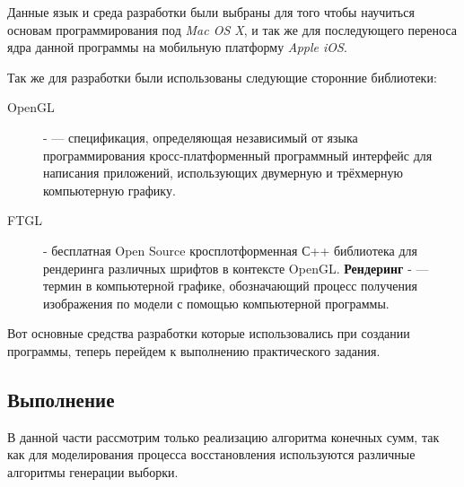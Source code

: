 Данные язык и среда разработки были выбраны для того чтобы научиться основам программирования под \textit{Mac OS X}, и так же для последующего переноса ядра данной программы на мобильную платформу \textit{Apple iOS}. 

Так же для разработки были использованы следующие сторонние библиотеки:
\begin{description}
\item[OpenGL] -  — спецификация, определяющая независимый от языка программирования кросс-платформенный программный интерфейс для написания приложений, использующих двумерную и трёхмерную компьютерную графику.
\item[FTGL] - бесплатная Open Source кросплотформенная С++ библиотека для рендеринга различных шрифтов в контексте OpenGL. {\bfseries Рендеринг} -  — термин в компьютерной графике, обозначающий процесс получения изображения по модели с помощью компьютерной программы.
\end{description}

Вот основные средства разработки которые использовались при создании программы, теперь перейдем к выполнению практического задания.
\begin{center}
\item\section{Выполнение}
\end{center}
В данной части рассмотрим только реализацию алгоритма конечных сумм, так как для моделирования процесса восстановления используются различные алгоритмы генерации выборки.

